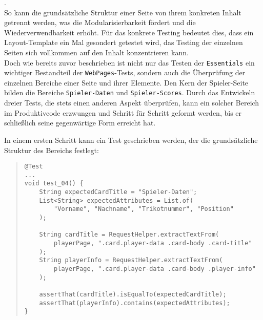 \cite{borowiec2024layouts}. \\ 
So kann die grundsätzliche Struktur einer Seite von ihrem konkreten Inhalt getrennt 
werden, was die Modularisierbarkeit fördert und die Wiederverwendbarkeit erhöht. 
Für das konkrete Testing bedeutet dies, dass ein Layout-Template ein Mal gesondert 
getestet wird, das Testing der einzelnen Seiten sich vollkommen auf den Inhalt 
konzentrieren kann. \\ 
Doch wie bereits zuvor beschrieben ist nicht nur das Testen der \texttt{Essentials} 
ein wichtiger Bestandteil der \texttt{WebPages}-Tests, sondern auch die Überprüfung 
der einzelnen Bereiche einer Seite und ihrer Elemente. Den Kern der Spieler-Seite 
bilden die Bereiche \texttt{Spieler-Daten} und \texttt{Spieler-Scores}. Durch das 
Entwickeln dreier Tests, die stets einen anderen Aspekt überprüfen, kann ein 
solcher Bereich im Produktivcode erzwungen und Schritt für Schritt geformt werden, 
bis er schließlich seine gegenwärtige Form erreicht hat. 

\pagebreak

In einem ersten Schritt kann ein Test geschrieben werden, der die grundsätzliche 
Struktur des Bereichs festlegt: 

\begin{quote}
\begin{verbatim}
@Test
...
void test_04() {
    String expectedCardTitle = "Spieler-Daten";
    List<String> expectedAttributes = List.of(
        "Vorname", "Nachname", "Trikotnummer", "Position"
    );

    String cardTitle = RequestHelper.extractTextFrom(
        playerPage, ".card.player-data .card-body .card-title"
    );
    String playerInfo = RequestHelper.extractTextFrom(
        playerPage, ".card.player-data .card-body .player-info"
    );

    assertThat(cardTitle).isEqualTo(expectedCardTitle);
    assertThat(playerInfo).contains(expectedAttributes);
}
\end{verbatim}
\end{quote}

